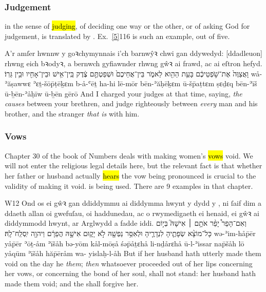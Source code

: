 \subsubsection{Judgement}

\begin{paper}
	{\click} {\shama} in the sense of \hl{judging}, of deciding one way or the other, or of asking God for judgement, is translated by . Ex.~\vref{5}{1}{16}{} is such an example, out of five.
\end{paper}

\begin{example}{5}{1}{16}{}{}
	\quoling
	{A'r amſer hwnnw y goꝛchymynnais i'ch barnwŷꝛ chwi gan ddywedyd:  [ddadleuon] rhwng eich bꝛodyꝛ, a bernwch gyfiawnder rhwng gŵꝛ ai frawd, ac ai eſtron hefyd.}
	{וָאֲצַוֶּה֙ אֶת־שֹׁ֣פְטֵיכֶ֔ם בָּעֵ֥ת הַהִ֖וא לֵאמֹ֑ר  בֵּין־אֲחֵיכֶם֙ וּשְׁפַטְתֶּ֣ם צֶ֔דֶק בֵּֽין־אִ֥ישׁ וּבֵין־אָחִ֖יו וּבֵ֥ין גֵּרֽוֹ׃}
	{wå-ʾăṣawwɛ ʾɛṯ-šōp̄ṭēḵɛm b-å-ʿēṯ ha-hi lē-mōr  bēn-ʾăḥēḵɛm ū-šp̄aṭtɛm ṣɛḏɛq bēn-ʾīš ū-ḇēn-ʾåḥīw ū-ḇēn gērō}
	{And I charged your judges at that time, saying,  \emph{the causes} between your brethren, and judge righteously between \emph{every} man and his brother, and the stranger \emph{that is} with him.}
\end{example}



\subsubsection{Vows}

\begin{paper}
	{\click} Chapter 30 of the book of Numbers deals with making women's \hl{vows} void. We will not enter the religious legal details here, but the relevant fact is that whether her father or husband actually \hl{hears} the vow being pronounced is crucial to the validity of making it void.  is being used. There are 9 examples in that chapter.
\end{paper}

\begin{example}{4}{30}{13}{}{W12}
	\quoling
	{Ond os ei gŵꝛ gan ddiddymmu ai diddymma hwynt y dydd y , ni ſaif dim a ddaeth allan oi gwefuſau, oi haddunedau, ac o rwymedigaeth ei henaid, ei gŵꝛ ai diddymmodd hwynt, ar Arglwydd a fadde iddi.}
	{וְאִם־הָפֵר֩ יָפֵ֨ר אֹתָ֥ם ׀ אִישָׁהּ֮ בְּי֣וֹם  כָּל־מוֹצָ֨א שְׂפָתֶ֧יהָ לִנְדָרֶ֛יהָ וּלְאִסַּ֥ר נַפְשָׁ֖הּ לֹ֣א יָק֑וּם אִישָׁ֣הּ הֲפֵרָ֔ם וַיהוָ֖ה יִֽסְלַֽח־לָֽהּ׃}
	{wə-ʾim-håp̄ēr yåp̄ēr ʾōṯ-åm ʾīšåh bə-yōm  kål-mōṣå śəp̄åṯɛhå li-nḏårɛhå ū-l-ʾissar nap̄šåh lō yåqūm ʾīšåh hăp̄ēråm wa-{\YHWH} yislaḥ-l-åh}
	{But if her husband hath utterly made them void on the day he  \textit{them}; \textit{then} whatsoever proceeded out of her lips concerning her vows, or concerning the bond of her soul, shall not stand: her husband hath made them void; and the {\LORD} shall forgive her.}
\end{example}



